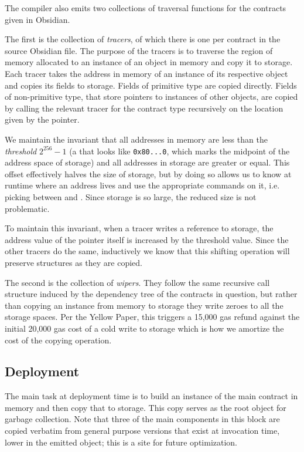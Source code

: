 The compiler also emits two collections of traversal functions for the
contracts given in Obsidian.

The first is the collection of \emph{tracers}, of which there is one per
contract in the source Obsidian file. The purpose of the tracers is to
traverse the region of memory allocated to an instance of an object in
memory and copy it to storage. Each tracer takes the address in memory of
an instance of its respective object and copies its fields to
storage. Fields of primitive type are copied directly. Fields of
non-primitive type, that store pointers to instances of other objects, are
copied by calling the relevant tracer for the contract type recursively on
the location given by the pointer.

We maintain the invariant that all addresses in memory are less than
the \emph{threshold} $2^{256}-1$ (a  that looks
like \texttt{0x80...0}, which marks the midpoint of the address space of
storage) and all addresses in storage are greater or equal. This offset
effectively halves the size of storage, but by doing so allows us to know
at runtime where an address lives and use the appropriate commands on it,
i.e. picking between  and . Since storage is so
large, the reduced size is not problematic.

To maintain this invariant, when a tracer writes a reference to storage,
the address value of the pointer itself is increased by the threshold
value. Since the other tracers do the same, inductively we know that this
shifting operation will preserve structures as they are copied.

The second is the collection of \emph{wipers}. They follow the same
recursive call structure induced by the dependency tree of the contracts in
question, but rather than copying an instance from memory to storage they
write zeroes to all the storage spaces. Per the Yellow Paper, this triggers
a 15,000 gas refund against the initial 20,000 gas cost of a cold write to
storage which is how we amortize the cost of the copying
operation. \cite{TODO}


\subsection{Deployment}

The main task at deployment time is to build an instance of the main
contract in memory and then copy that to storage. This copy serves as the
root object for garbage collection. Note that three of the main components
in this block are copied verbatim from general purpose versions that exist
at invocation time, lower in the emitted object; this is a site for future
optimization.

